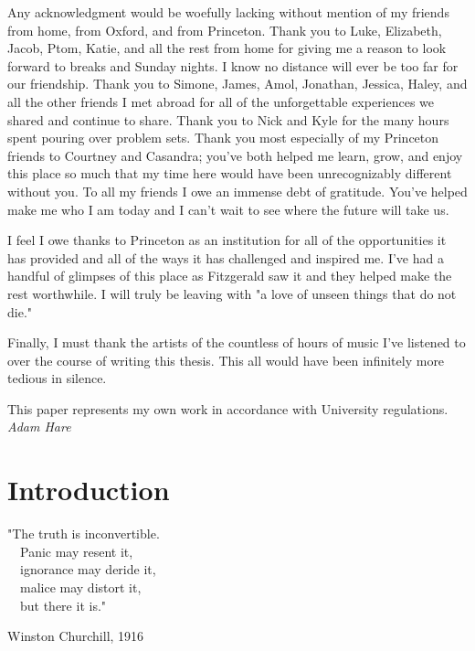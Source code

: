 \documentclass [12 pt] {report}
\begin{document}
\vspace{3mm}

Any acknowledgment would be woefully lacking without mention of my friends from home, from Oxford, and from Princeton. Thank you to Luke, Elizabeth, Jacob, Ptom, Katie, and all the rest from home for giving me a reason to look forward to breaks and Sunday nights. I know no distance will ever be too far for our friendship. Thank you to Simone, James, Amol, Jonathan, Jessica, Haley, and all the other friends I met abroad for all of the unforgettable experiences we shared and continue to share. Thank you to Nick and Kyle for the many hours spent pouring over problem sets. Thank you most especially of my Princeton friends to Courtney and Casandra; you've both helped me learn, grow, and enjoy this place so much that my time here would have been unrecognizably different without you. To all my friends I owe an immense debt of gratitude. You've helped make me who I am today and I can't wait to see where the future will take us.

\vspace{3mm}

I feel I owe thanks to Princeton as an institution for all of the opportunities it has provided and all of the ways it has challenged and inspired me. I've had a handful of glimpses of this place as Fitzgerald saw it and they helped make the rest worthwhile. I will truly be leaving with "a love of unseen things that do not die."

\vspace{3mm}

Finally, I must thank the artists of the countless of hours of music I've listened to over the course of writing this thesis. This all would have been infinitely more tedious in silence.

\vspace*{\fill}
\noindent
\hspace*{\fill}This paper represents my own work in accordance with University regulations.\\
\hspace*{\fill} \textit{Adam Hare}
{\let\cleardoublepage\clearpage 
\tableofcontents
}
\listoftables
{}
\listoffigures
{}
\newpage
{}
\setcounter{page}{1}
\chapter{Introduction}
\singlespacing
\epigraph{"The truth is inconvertible.\\ ~~Panic may resent it,\\ ~~ignorance may deride it,\\ ~~malice may distort it,\\ ~~but there it is."}{Winston Churchill, 1916}
\doublespacing
\end{document}
